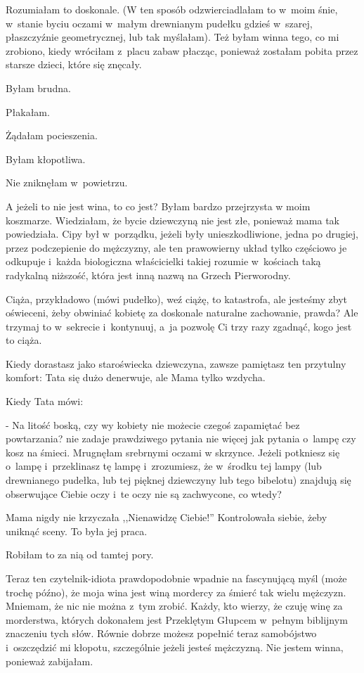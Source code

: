 \documentclass[oneside,polish,12pt,sfheadings]{mwbk}
\begin{document}
Rozumiałam to doskonale. (W ten sposób odzwierciadlałam to w~moim
śnie, w~stanie byciu oczami w~małym drewnianym pudełku gdzieś w~szarej,
płaszczyźnie geometrycznej, lub tak myślałam). Też byłam winna tego,
co mi zrobiono, kiedy wróciłam z~placu zabaw płacząc, ponieważ zostałam
pobita przez starsze dzieci, które się znęcały.

Byłam brudna.

Płakałam.

Żądałam pocieszenia.

Byłam kłopotliwa.

Nie zniknęłam w~powietrzu.

A jeżeli to nie jest wina, to co jest? Byłam bardzo przejrzysta w
moim koszmarze. Wiedziałam, że bycie dziewczyną nie jest złe, ponieważ
mama tak powiedziała. Cipy był w~porządku, jeżeli były unieszkodliwione,
jedna po drugiej, przez podczepienie do mężczyzny, ale ten prawowierny
układ tylko częściowo je odkupuje i~każda biologiczna właścicielki
takiej rozumie w~kościach taką radykalną niższość, która jest inną
nazwą na Grzech Pierworodny.

Ciąża, przykładowo (mówi pudełko), weź ciążę, to katastrofa, ale jesteśmy
zbyt oświeceni, żeby obwiniać kobietę za doskonale naturalne zachowanie,
prawda? Ale trzymaj to w~sekrecie i~kontynuuj, a~ja pozwolę Ci trzy
razy zgadnąć, kogo jest to ciąża.

Kiedy dorastasz jako staroświecka dziewczyna, zawsze pamiętasz ten
przytulny komfort: Tata się dużo denerwuje, ale Mama tylko wzdycha.

Kiedy Tata mówi: 

- Na litość boską, czy wy kobiety nie możecie czegoś
zapamiętać bez powtarzania? nie zadaje prawdziwego pytania nie więcej
jak pytania o~lampę czy kosz na śmieci. Mrugnęłam srebrnymi oczami
w skrzynce. Jeżeli potkniesz się o~lampę i~przeklinasz tę lampę i~zrozumiesz,
że w~środku tej lampy (lub drewnianego pudełka, lub tej pięknej dziewczyny
lub tego bibelotu) znajdują się obserwujące Ciebie oczy i~te oczy
nie są zachwycone, co wtedy?

Mama nigdy nie krzyczała ,,Nienawidzę Ciebie!'' Kontrolowała siebie,
żeby uniknąć sceny. To była jej praca.

Robiłam to za nią od tamtej pory.

Teraz ten czytelnik-idiota prawdopodobnie wpadnie na fascynującą myśl
(może trochę późno), że moja wina jest winą mordercy za śmierć tak
wielu mężczyzn. Mniemam, że nic nie można z~tym zrobić. Każdy, kto
wierzy, że czuję winę za morderstwa, których dokonałem jest Przeklętym
Głupcem w~pełnym biblijnym znaczeniu tych słów. Równie dobrze możesz
popełnić teraz samobójstwo i~oszczędzić mi kłopotu, szczególnie jeżeli
jesteś mężczyzną. Nie jestem winna, ponieważ zabijałam.
\end{document}
